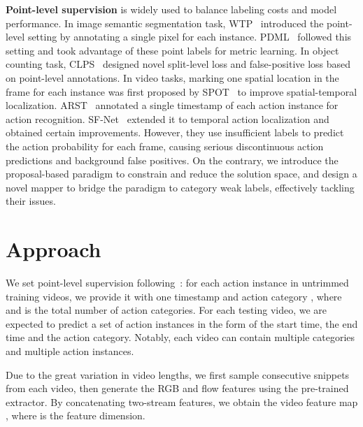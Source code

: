 \documentclass[final]{cvpr}
\begin{document}
\textbf{Point-level supervision} is widely used to balance labeling costs and model performance.
In image semantic segmentation task, WTP~\cite{bearman2016s} introduced the point-level setting by annotating a single pixel for each instance. PDML~\cite{qian2019weakly} followed this setting and took advantage of these point labels for metric learning. In object counting task, CLPS~\cite{laradji2018blobs} designed novel split-level loss and false-positive loss based on point-level annotations.
In video tasks, marking one spatial location in the frame for each instance was first proposed by SPOT~\cite{mettes2016spot} to improve spatial-temporal localization. ARST~\cite{moltisanti2019action} annotated a single timestamp of each action instance for action recognition. SF-Net~\cite{ma2020sf} extended it to temporal action localization and obtained certain improvements.
However, they use insufficient labels to predict the action probability for each frame, causing serious discontinuous action predictions and background false positives.
On the contrary, we introduce the proposal-based paradigm to constrain and reduce the solution space, and design a novel mapper to bridge the paradigm to category weak labels, effectively tackling their issues.





\section{Approach}
We set point-level supervision following~\cite{ma2020sf}: for each action instance in  untrimmed training videos, we provide it with one timestamp  and action category , where  and  is the total number of action categories. For each testing video, we are expected to predict a set of action instances in the form of the start time, the end time and the action category. Notably, each video can contain multiple categories and multiple action instances.



Due to the great variation in video lengths, we first sample  consecutive snippets from each video, then generate the RGB and flow features using the pre-trained extractor. By concatenating two-stream features, we obtain the video feature map , where  is the feature dimension.
\end{document}
